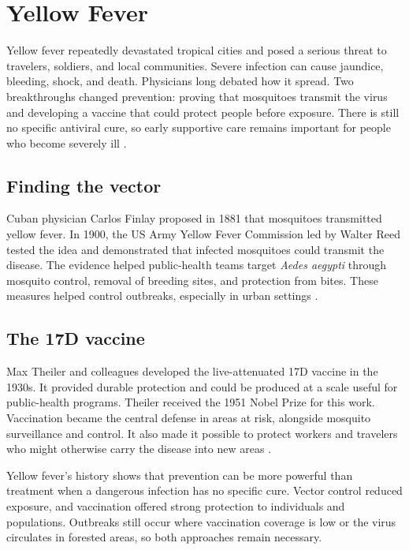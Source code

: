 \documentclass[12pt,oneside]{book}
\begin{document}
\chapter[Yellow Fever]{Yellow Fever}

Yellow fever repeatedly devastated tropical cities and posed a serious threat
to travelers, soldiers, and local communities. Severe infection can cause
jaundice, bleeding, shock, and death. Physicians long debated how it spread.
Two breakthroughs changed prevention: proving that mosquitoes transmit the
virus and developing a vaccine that could protect people before exposure.
There is still no specific antiviral cure, so early supportive care remains
important for people who become severely ill \cite{whoVaccineHistory,yellowFeverVaccineHistory}.

\section{Finding the vector}
Cuban physician Carlos Finlay proposed in 1881 that mosquitoes transmitted
yellow fever. In 1900, the US Army Yellow Fever Commission led by Walter Reed
tested the idea and demonstrated that infected mosquitoes could transmit the
disease. The evidence helped public-health teams target \emph{Aedes aegypti}
through mosquito control, removal of breeding sites, and protection from
bites. These measures helped control outbreaks, especially in urban settings
\cite{whoVaccineHistory,yellowFeverVaccineHistory}.

\section{The 17D vaccine}
Max Theiler and colleagues developed the live-attenuated 17D vaccine in the
1930s. It provided durable protection and could be produced at a scale useful
for public-health programs. Theiler received the 1951 Nobel Prize for this
work. Vaccination became the central defense in areas at risk, alongside
mosquito surveillance and control. It also made it possible to protect
workers and travelers who might otherwise carry the disease into new areas
\cite{whoVaccineHistory,yellowFeverVaccineHistory}.

Yellow fever's history shows that prevention can be more powerful than
treatment when a dangerous infection has no specific cure. Vector control
reduced exposure, and vaccination offered strong protection to individuals
and populations. Outbreaks still occur where vaccination coverage is low or
the virus circulates in forested areas, so both approaches remain necessary.
\end{document}
